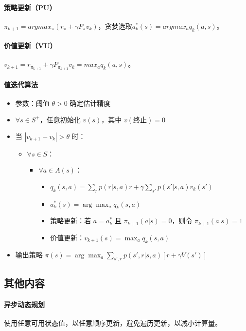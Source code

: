 \documentclass[
12pt, %
a4paper, 
oneside, %
headinclude,footinclude, %
]{scrartcl}
\begin{document}
\paragraph{策略更新（PU）}
$ \pi_{k + 1} = argmax_{\pi}(r_{\pi} + \gamma P_{\pi}v_k) $，贪婪选取$ a^*_k(s) = argmax_a q_k(a, s) $。
\paragraph{价值更新（VU）}
 $ v_{k + 1} = r_{\pi_{k + 1}} + \gamma P_{\pi_{k + 1}}v_k = max_a q_k(a, s) $。
\paragraph{值迭代算法}
\begin{itemize}
\item 参数：阈值 $\theta > 0$ 确定估计精度
\item $\forall s \in S^+$，任意初始化 $v(s)$，其中 $v(\text{终止}) = 0$
\item 当 $|v_{k + 1} - v_k| > \theta$ 时：
\begin{itemize}
\item $\forall s \in S$：
\begin{itemize}
\item $\forall a \in A(s)$：
\begin{itemize}
\item $q_k(s, a) = \sum_r p(r|s, a)r + \gamma \sum_{s'} p(s'|s, a)v_k(s')$
\item $a^*_k(s) = \arg\max_a q_k(s, a)$
\item 策略更新：若 $a = a^*_k$ 且 $\pi_{k + 1}(a|s) = 0$，则令 $\pi_{k + 1}(a|s) = 1$
\item 价值更新：$v_{k + 1}(s) = \max_a q_k(s, a)$
\end{itemize}
\end{itemize}
\end{itemize}
\item 输出策略 $\pi(s) = \arg\max_a \sum_{s',r}p(s',r|s,a)[r + \gamma V(s')]$
\end{itemize}
\subsection{其他内容}
\paragraph{异步动态规划}
使用任意可用状态值，以任意顺序更新，避免遍历更新，以减小计算量。
\end{document}
